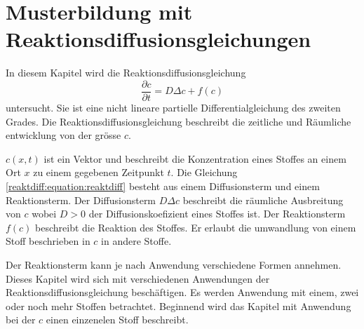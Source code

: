 %
%
%
%
\chapter{Musterbildung mit Reaktionsdiffusionsgleichungen\label{chapter:reaktdiff}}
\begin{refsection}

In diesem Kapitel wird die Reaktionsdiffusionsgleichung
\begin{equation}
\label{reaktdiff:equation:reaktdiff}
\frac{\partial c}{\partial t} = D \Delta c + f(c)
\end{equation}
untersucht.
Sie ist eine nicht lineare partielle Differentialgleichung des zweiten Grades.
Die Reaktionsdiffusionsgleichung beschreibt die zeitliche und Räumliche entwicklung von der grösse \(c\).

\(c(x,t)\) ist ein Vektor und beschreibt die Konzentration eines Stoffes an einem Ort \(x\) zu einem gegebenen Zeitpunkt \(t\).
Die Gleichung \ref{reaktdiff:equation:reaktdiff} besteht aus einem Diffusionsterm und einem Reaktionsterm.
Der Diffusionsterm \(D \Delta c\) beschreibt die räumliche Ausbreitung von \(c\) wobei \(D > 0\) der Diffusionskoefizient eines Stoffes ist.
Der Reaktionsterm \(f(c)\) beschreibt die Reaktion des Stoffes.
Er erlaubt die umwandlung von einem Stoff beschrieben in \(c\) in andere Stoffe.

Der Reaktionsterm kann je nach Anwendung verschiedene Formen annehmen.
Dieses Kapitel wird sich mit verschiedenen Anwendungen der Reaktionsdiffusionsgleichung beschäftigen.
Es werden Anwendung mit einem, zwei oder noch mehr Stoffen betrachtet.
Beginnend wird das Kapitel mit Anwendung bei der \(c\) einen einzenelen Stoff beschreibt.







\printbibliography[heading=subbibliography]
\end{refsection}
